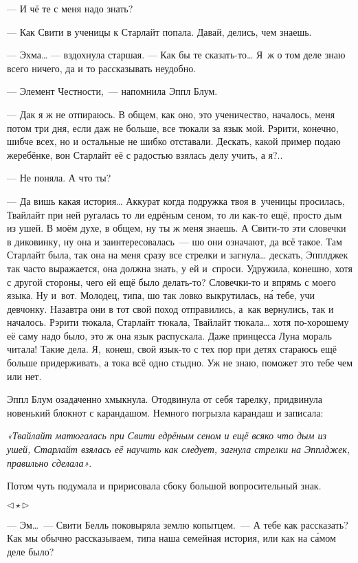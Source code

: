 \documentclass[fontsize=11pt,a5paper,titlepage=firstcover]{scrbook}
\begin{document}
--- И чё те с меня надо знать?

--- Как Свити в ученицы к Старлайт попала. Давай, делись, чем знаешь.

--- Эхма{\ldots} --- вздохнула старшая. --- Как бы те сказать-то{\ldots} Я~ж о том деле знаю всего ничего, да и то рассказывать неудобно.

--- Элемент Честности,~--- напомнила Эппл Блум.

--- Дак я ж не отпираюсь. В общем, как оно, это ученичество, началось, меня потом три дня, если даж не больше, все тюкали за язык мой. Рэрити, конечно, шибче всех, но и остальные не шибко отставали. Дескать, какой пример подаю жеребёнке, вон Старлайт её с радостью взялась делу учить, а я?..

--- Не поняла. А что ты?

--- Да вишь какая история{\ldots} Аккурат когда подружка твоя в~ученицы просилась, Твайлайт при ней ругалась то ли едрёным сеном, то ли как-то ещё, просто дым из ушей. В моём духе, в общем, ну ты ж меня знаешь. А Свити-то эти словечки в диковинку, ну она и заинтересовалась~--- шо они означают, да всё такое. Там Старлайт была, так она на меня сразу все стрелки и загнула{\ldots} дескать, Эпплджек так часто выражается, она должна знать, у ей и~спроси. Удружила, конешно, хотя с другой стороны, чего ей ещё было делать-то? Словечки-то и впрямь с моего языка. Ну и~вот. Молодец, типа, шо так ловко выкрутилась, на́ тебе, учи девчонку. Назавтра они в тот свой поход отправились, а~как вернулись, так и началось. Рэрити тюкала, Старлайт тюкала, Твайлайт тюкала{\ldots} хотя по-хорошему её саму надо было, это ж она язык распускала. Даже принцесса Луна мораль читала! Такие дела. Я,~конеш, свой язык-то с тех пор при детях стараюсь ещё больше придерживать, а тока всё одно стыдно. Уж не знаю, поможет это тебе чем или нет.

Эппл Блум озадаченно хмыкнула. Отодвинула от себя тарелку, придвинула новенький блокнот с карандашом. Немного погрызла карандаш и записала:

\emph{«Твайлайт матюгалась при Свити едрёным сеном и ещё всяко что дым из ушей, Старлайт взялась её научить как следует, загнула стрелки на Эпплджек, правильно сделала»}.

Потом чуть подумала и пририсовала сбоку большой вопросительный знак.
\begin{center}$\triangleleft\star\triangleright$\end{center}

--- Эм{\ldots}~--- Свити Белль поковыряла землю копытцем.~--- А тебе как рассказать? Как мы обычно рассказываем, типа наша семейная история, или как на са́мом деле было?
\end{document}
